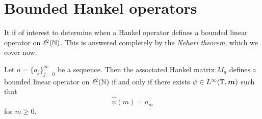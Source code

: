 \section{Bounded Hankel operators}
It if of interest to determine when a Hankel operator defines
a bounded linear operator on $\ell^2(\mathbb{N})$. This is answered completely by the
\emph{Nehari theorem}, which we cover now.
\begin{theorem}
\label{nehari}
    Let $a = \{a_j\}_{j=0}^\infty$ be a sequence. Then the 
    associated Hankel matrix $M_a$ defines a bounded linear operator on $\ell^2(\mathbb{N})$
    if and only if there exists $\psi \in L^\infty(\mathbb{T},\boldsymbol{m})$ such that
    \begin{equation*}
        \hat{\psi}(m) = a_m
    \end{equation*}
    for $m \geq 0$.
\end{theorem}
